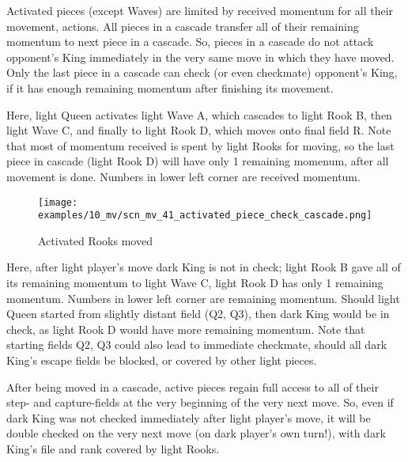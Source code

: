 \vspace*{-0.3\baselineskip}
Activated pieces (except Waves) are limited by received momentum for all their movement,
actions. All pieces in a cascade transfer all of their remaining momentum to next piece
in a cascade. So, pieces in a cascade do not attack opponent's King immediately in the
very same move in which they have moved. Only the last piece in a cascade can check (or
even checkmate) opponent's King, if it has enough remaining momentum after finishing its
movement.

Here, light Queen activates light Wave A, which cascades to light Rook B, then light
Wave C, and finally to light Rook D, which moves onto final field R. Note that most
of momentum received is spent by light Rooks for moving, so the last piece in cascade
(light Rook D) will have only 1 remaining momenum, after all movement is done. Numbers
in lower left corner are received momentum.

\clearpage %

\vspace*{-2.1\baselineskip}
\noindent
\begin{figure}[!h]
\texttt{[image: examples/10\_mv/scn\_mv\_41\_activated\_piece\_check\_cascade.png]}
\caption{Activated Rooks moved}
\label{fig:scn_mv_41_activated_piece_check_cascade}
\end{figure}

Here, after light player's move dark King is not in check; light Rook B gave all of its
remaining momentum to light Wave C, light Rook D has only 1 remaining momentum. Numbers
in lower left corner are remaining momentum. Should light Queen started from slightly
distant field (Q2, Q3), then dark King would be in check, as light Rook D would have
more remaining momentum. Note that starting fields Q2, Q3 could also lead to immediate
checkmate, should all dark King's escape fields be blocked, or covered by other light
pieces.

After being moved in a cascade, active pieces regain full access to all of their step- and
capture-fields at the very beginning of the very next move. So, even if dark King was not
checked immediately after light player's move, it will be double checked on the very next
move (on dark player's own turn!), with dark King's file and rank covered by light Rooks.

\clearpage %

